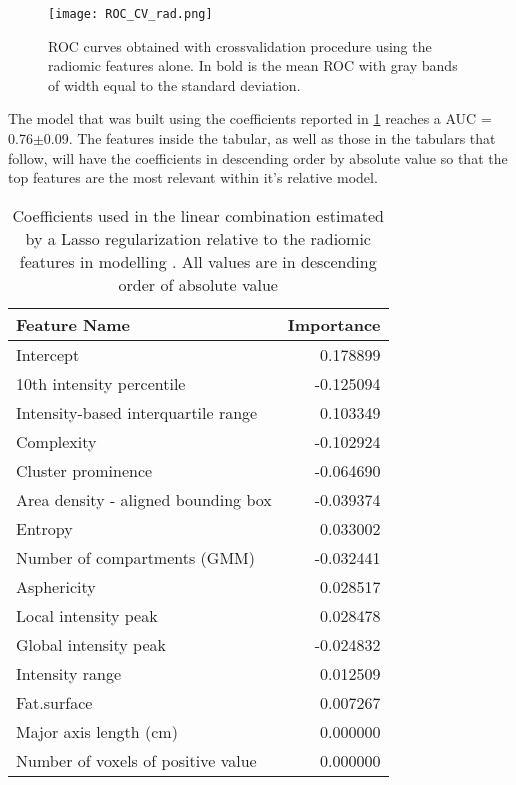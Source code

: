 \begin{figure}[htbp]
	\centering
  		\texttt{[image: ROC\_CV\_rad.png]}
        \caption{ROC curves obtained with crossvalidation procedure using the radiomic features alone. In bold is the mean ROC with gray bands of width equal to the standard deviation. \label{RocDeathRad}}
\end{figure}

The model that was built using the coefficients reported in \ref{tab:ParamRad} reaches a AUC = 0.76$\pm$0.09. The features inside the tabular, as well as those in the tabulars that follow, will have the coefficients in descending order by absolute value so that the top features are the most relevant within it's relative model.

\begin{table}
\caption{Coefficients used in the linear combination estimated by a Lasso regularization relative to the radiomic features in modelling \death. All values are in descending order of absolute value\label{tab:ParamRad}}
\centering 
	\begin{tabular}{lr}
		\toprule
		Feature Name &   Importance \\
		\midrule
		Intercept                           &                      0.178899 \\
		10th intensity percentile           &                     -0.125094 \\
		Intensity-based interquartile range &                      0.103349 \\
		Complexity                          &                     -0.102924 \\
		Cluster prominence                  &                     -0.064690 \\
		Area density - aligned bounding box &                     -0.039374 \\
		Entropy                             &                      0.033002 \\
		Number of compartments (GMM)        &                     -0.032441 \\
		Asphericity                         &                      0.028517 \\
		Local intensity peak                &                      0.028478 \\
		Global intensity peak               &                     -0.024832 \\
		Intensity range                     &                      0.012509 \\
		Fat.surface                         &                      0.007267 \\
		Major axis length (cm)              &                      0.000000 \\
		Number of voxels of positive value  &                      0.000000 \\
		\bottomrule
	\end{tabular}
\end{table}

